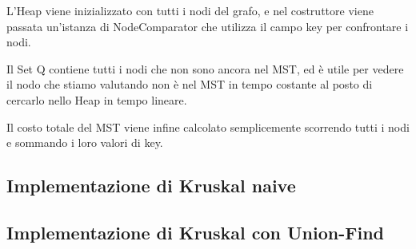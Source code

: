 L'Heap viene inizializzato con tutti i nodi del grafo, e nel costruttore viene passata un'istanza di NodeComparator che utilizza il campo key per confrontare i nodi. 

Il Set Q contiene tutti i nodi che non sono ancora nel MST, ed è utile per vedere il nodo che stiamo valutando non è nel MST in tempo costante al posto di cercarlo nello Heap in tempo lineare.

Il costo totale del MST viene infine calcolato semplicemente scorrendo tutti i nodi e sommando i loro valori di key.
\subsection{Implementazione di Kruskal naive}
\subsection{Implementazione di Kruskal con Union-Find}